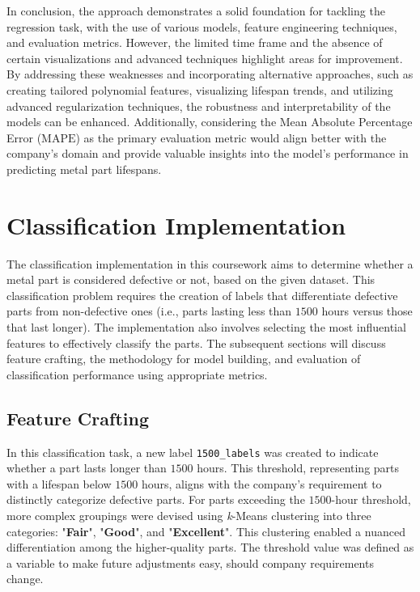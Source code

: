 \documentclass{article}
\begin{document}
In conclusion, the approach demonstrates a solid foundation for tackling the regression task, with the use of various models, feature engineering techniques, and evaluation metrics. However, the limited time frame and the absence of certain visualizations and advanced techniques highlight areas for improvement. By addressing these weaknesses and incorporating alternative approaches, such as creating tailored polynomial features, visualizing lifespan trends, and utilizing advanced regularization techniques, the robustness and interpretability of the models can be enhanced. Additionally, considering the Mean Absolute Percentage Error ($\text{MAPE}$) as the primary evaluation metric would align better with the company's domain and provide valuable insights into the model's performance in predicting metal part lifespans.

\section{Classification Implementation}

The classification implementation in this coursework aims to determine whether a metal part is considered defective or not, based on the given dataset. This classification problem requires the creation of labels that differentiate defective parts from non-defective ones (i.e., parts lasting less than $1500$ hours versus those that last longer). The implementation also involves selecting the most influential features to effectively classify the parts. The subsequent sections will discuss feature crafting, the methodology for model building, and evaluation of classification performance using appropriate metrics.

\subsection{Feature Crafting}

In this classification task, a new label \texttt{1500\_labels} was created to indicate whether a part lasts longer than $1500$ hours. This threshold, representing parts with a lifespan below $1500$ hours, aligns with the company's requirement to distinctly categorize defective parts. For parts exceeding the $1500$-hour threshold, more complex groupings were devised using \emph{k}-Means clustering into three categories: "\textbf{Fair}", "\textbf{Good}", and "\textbf{Excellent}". This clustering enabled a nuanced differentiation among the higher-quality parts. The threshold value was defined as a variable to make future adjustments easy, should company requirements change.
\end{document}
